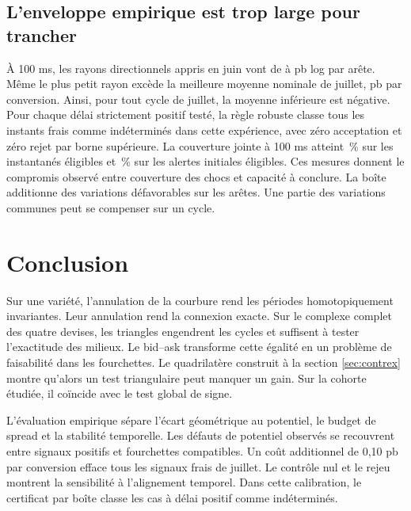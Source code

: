 \documentclass[11pt,a4paper]{article}
\theoremstyle{clair}
\begin{document}
\subsection{L'enveloppe empirique est trop large pour trancher}

À 100 ms, les rayons directionnels appris en juin vont de \RayonCentMin{} à \RayonCentMax{} pb log par arête. Même le plus petit rayon excède la meilleure moyenne nominale de juillet, \JuilletMarge{} pb par conversion. Ainsi, pour tout cycle de juillet, la moyenne inférieure est négative. Pour chaque délai strictement positif testé, la règle robuste classe tous les instants frais comme indéterminés dans cette expérience, avec zéro acceptation et zéro rejet par borne supérieure. La couverture jointe à 100 ms atteint \ReplayCentPairesOk{}\,\% sur les instantanés éligibles et \ReplayCentAlertesCouv{}\,\% sur les alertes initiales éligibles. Ces mesures donnent le compromis observé entre couverture des chocs et capacité à conclure. La boîte additionne des variations défavorables sur les arêtes. Une partie des variations communes peut se compenser sur un cycle.

\clearpage


\clearpage
\section{Conclusion}
\label{sec:conclusion}

Sur une variété, l'annulation de la courbure rend les périodes homotopiquement invariantes. Leur annulation rend la connexion exacte. Sur le complexe complet des quatre devises, les triangles engendrent les cycles et suffisent à tester l'exactitude des milieux. Le bid--ask transforme cette égalité en un problème de faisabilité dans les fourchettes. Le quadrilatère construit à la section \ref{sec:contrex} montre qu'alors un test triangulaire peut manquer un gain. Sur la cohorte étudiée, il coïncide avec le test global de signe.

L'évaluation empirique sépare l'écart géométrique au potentiel, le budget de spread et la stabilité temporelle. Les défauts de potentiel observés se recouvrent entre signaux positifs et fourchettes compatibles. Un coût additionnel de 0,10 pb par conversion efface tous les signaux frais de juillet. Le contrôle nul et le rejeu montrent la sensibilité à l'alignement temporel. Dans cette calibration, le certificat par boîte classe les cas à délai positif comme indéterminés.
\end{document}
